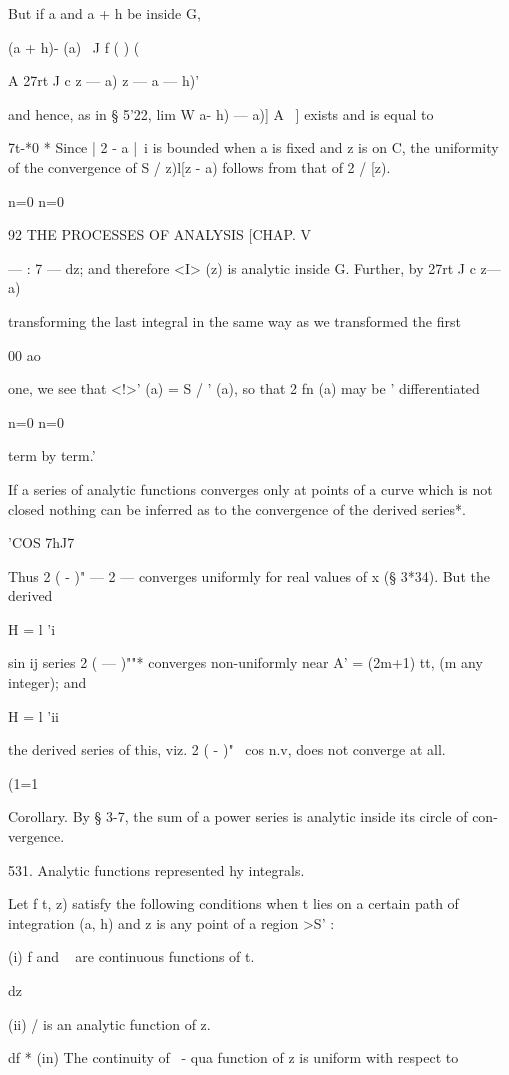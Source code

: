 {{But if a and a + h be inside G,

 (a + h)- (a) \ J f ( ) (

A 27rt J c z — a) z — a — h)'

and hence, as in § 5'22, lim W a- h) — a)] A~ ] exists and is equal to

7t-*0 * Since | 2 - a |~i is bounded when a is fixed and z is on C,
the uniformity of the convergence of S / z)l[z - a) follows from that
of 2 / [z).

n=0 n=0

92 THE PROCESSES OF ANALYSIS [CHAP. V

  — : 7 — dz; and therefore <I> (z) is analytic inside G. Further, by
27rt J c z— a)

transforming the last integral in the same way as we transformed the
first

00 ao

one, we see that <!>' (a) = S / ' (a), so that 2 fn (a) may be '
differentiated

n=0 n=0

term by term.'

If a series of analytic functions converges only at points of a curve
which is not closed nothing can be inferred as to the convergence of
the derived series*.

'COS 7hJ7

Thus 2 ( - )" — 2 — converges uniformly for real values of x (§ 3*34).
But the derived

H = l 'i

  sin ij series 2 ( — )""* converges non-uniformly near A' = (2m+1)
tt, (m any integer); and

H = l 'ii

the derived series of this, viz. 2 ( - )"~ cos n.v, does not converge
at all.

(1=1

Corollary. By § 3-7, the sum of a power series is analytic inside its
circle of con- vergence.

531. Analytic functions represented hy integrals.

Let f t, z) satisfy the following conditions when t lies on a certain
path of integration (a, h) and z is any point of a region >S' :

(i) f and ~ are continuous functions of t.

   dz

(ii) / is an analytic function of z.

df * (in) The continuity of ~- qua function of z is uniform with
respect to

}}
